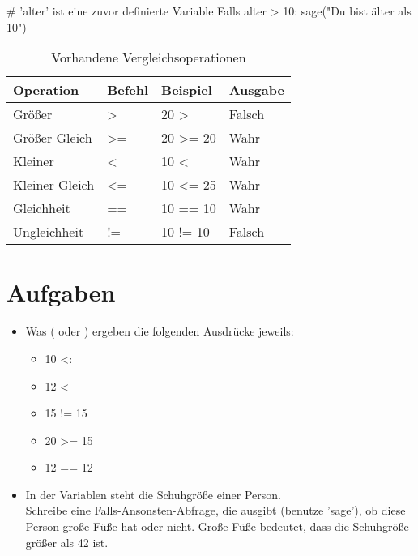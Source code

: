 \documentclass{\VorlagenPfad/coderdojokatext}
\begin{document}
\begin{pseudocode}
# 'alter' ist eine zuvor definierte Variable
Falls alter > 10:
	sage("Du bist älter als 10")
\end{pseudocode}

\clearpage

\begin{table}[t,clr]
	\begin{center}
	\begin{tabular}{|l|l|l|l|}
		\hline
		Operation		& Befehl		   	& Beispiel			 				& Ausgabe\\ \hline\hline
		Größer         	& \textgreater  	& 20 \textgreater\space20  			& Falsch \\ \hline
		Größer Gleich  	& \textgreater= 	& 20 \textgreater= 20 				& Wahr   \\ \hline
		Kleiner        	& \textless     	& 10 \textless\space30				& Wahr   \\ \hline
		Kleiner Gleich	& \textless=    	& 10 \textless= 25	    			& Wahr   \\ \hline
		Gleichheit    	& ==            	& 10 == 10	            			& Wahr   \\ \hline
		Ungleichheit  	& !=            	& 10 != 10            				& Falsch \\ \hline
	\end{tabular}
	\caption{Vorhandene Vergleichsoperationen}
	\end{center}
\end{table}

\section{Aufgaben}
\begin{itemize}
	\item Was ( oder ) ergeben die folgenden Ausdrücke jeweils:
	\begin{itemize}
		\item 10 \textless{}:
		\item 12 \textless{}
		\item 15 != 15
		\item 20 \textgreater= 15
		\item 12 == 12
	\end{itemize}
	\item In der Variablen  steht die Schuhgröße einer Person.
	\\
	Schreibe eine Falls-Ansonsten-Abfrage, die ausgibt (benutze 'sage'), ob diese Person große Füße hat oder nicht. Große Füße bedeutet, dass die Schuhgröße größer als 42 ist.
\end{itemize}
\end{document}
